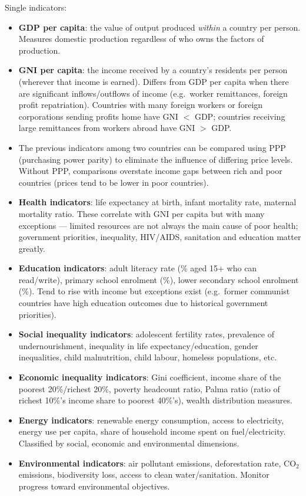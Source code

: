 Single indicators:
\begin{itemize}
  \item \textbf{GDP per capita}: the value of output produced \textit{within} a country per person. Measures domestic production regardless of who owns the factors of production.
  \item \textbf{GNI per capita}: the income received by a country's residents per person (wherever that income is earned). Differs from GDP per capita when there are significant inflows/outflows of income (e.g.\ worker remittances, foreign profit repatriation). Countries with many foreign workers or foreign corporations sending profits home have GNI $<$ GDP; countries receiving large remittances from workers abroad have GNI $>$ GDP.
  \item The previous indicators among two countries can be compared using PPP (purchasing power parity) to eliminate the influence of differing price levels. Without PPP, comparisons overstate income gaps between rich and poor countries (prices tend to be lower in poor countries).
  \item \textbf{Health indicators}: life expectancy at birth, infant mortality rate, maternal mortality ratio. These correlate with GNI per capita but with many exceptions --- limited resources are not always the main cause of poor health; government priorities, inequality, HIV/AIDS, sanitation and education matter greatly.
  \item \textbf{Education indicators}: adult literacy rate (\% aged 15+ who can read/write), primary school enrolment (\%), lower secondary school enrolment (\%). Tend to rise with income but exceptions exist (e.g.\ former communist countries have high education outcomes due to historical government priorities).
  \item \textbf{Social inequality indicators}: adolescent fertility rates, prevalence of undernourishment, inequality in life expectancy/education, gender inequalities, child malnutrition, child labour, homeless populations, etc.
  \item \textbf{Economic inequality indicators}: Gini coefficient, income share of the poorest 20\%/richest 20\%, poverty headcount ratio, Palma ratio (ratio of richest 10\%'s income share to poorest 40\%'s), wealth distribution measures.
  \item \textbf{Energy indicators}: renewable energy consumption, access to electricity, energy use per capita, share of household income spent on fuel/electricity. Classified by social, economic and environmental dimensions.
  \item \textbf{Environmental indicators}: air pollutant emissions, deforestation rate, CO$_2$ emissions, biodiversity loss, access to clean water/sanitation. Monitor progress toward environmental objectives.
\end{itemize}
